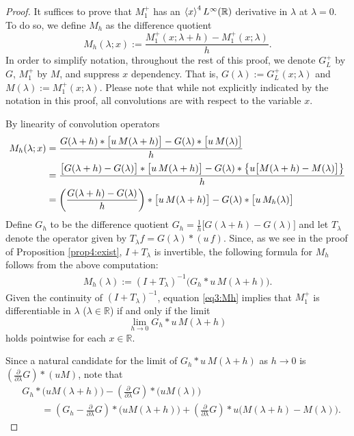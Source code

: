 \documentclass[../dissertation.tex]{subfiles}
\begin{document}
\begin{proof}
	It suffices to prove that $M_1^+$ has an $\left\langle x \right\rangle^4L^\infty(\mathbb R)$ 
	derivative in $\lambda$ at $\lambda = 0$. To do so, we 
	define $M_h$ as the difference quotient
	\[
		M_h(\lambda; x) :=
			\frac{M_1^+(x; \lambda +h) - M_1^+(x; \lambda)}{h}.
	\]
	In order to simplify notation, throughout the rest of this proof,
	we denote $G_L^+$ by $G$, $M_1^+$ by $M$, and suppress $x$ dependency.
	That is, $G(\lambda):= G_L^+(x; \lambda)$ and $M(\lambda):=M_1^+(x; \lambda)$.
	Please note that while not explicitly indicated by the notation in this
	proof, all convolutions are with respect to the variable $x$.

	By linearity of convolution operators 
	\begin{align*}
		M_h(\lambda; x)
			&= 
				\frac{
					G(\lambda+h)* \big[u\,M(\lambda+h)\big]
					-G(\lambda) * \big[u\,M(\lambda)\big]
				}
				{h} \\[.1\baselineskip]
			&= 
				\frac{
					\big[
						G(\lambda+h) - G(\lambda)
					\big]
						* \big[u\,M(\lambda+h)\big]
					- G(\lambda) 
						* 
							\big\{
								u
								\big[
									M(\lambda+h)
									-M(\lambda)
								\big]
							\big\}
				}
				{h} \\
			&= 
				\left(
					\frac{G(\lambda+h)-G(\lambda)}{h}
				\right)
					* \big[u\,M(\lambda+h)\big]
				- G(\lambda) 
					* \big[ u \, M_h(\lambda) \big]
	\end{align*}
	Define $G_h$ to be the difference quotient 
	$G_h = \frac{1}{h}\big[G(\lambda+h) - G(\lambda)\big]$ and let 
	$T_\lambda$ denote the operator given by $T_\lambda f = G(\lambda)*(u\,f)$.
	Since, as we see in the proof of Proposition \ref{prop4:exist}, $I + T_\lambda$
	is invertible, the following formula for $M_h$ follows from the above 
	computation:
	\begin{align}\label{eq3:Mh}
		M_h(\lambda) := (I + T_\lambda)^{-1} \big(G_h * u\, M(\lambda+h)\big).
	\end{align}
	Given the continuity of $(I + T_\lambda)^{-1}$, equation \eqref{eq3:Mh}
	implies that $M_1^+$ is differentiable in $\lambda$ ($\lambda \in \mathbb R$)
	if and only if the limit 
	\[
		\lim_{h\to0} G_h * u\, M(\lambda+h)
	\]
	holds pointwise for each $x \in \mathbb R$. 

	Since a natural candidate for the limit of $G_h * u\, M(\lambda+h)$
	as $h\to 0$ is $\left(\frac{\partial}{\partial \lambda}G\right) * (uM)$,
	note that
	\begin{align}
		&G_h*\big(uM(\lambda+h)\big) 
				- \left(\frac{\partial}{\partial \lambda}G\right) 
					* \big(uM(\lambda)\big) \\
			&\qquad=
				\left(G_h - \frac{\partial}{\partial \lambda}G\right)
						* \big(uM(\lambda +h)\big)
					+ \left(\frac{\partial}{\partial \lambda}G\right)
						* u \big(M(\lambda+h) - M(\lambda)\big).
				\nonumber
	\end{align}
	

\end{proof}
\end{document}
